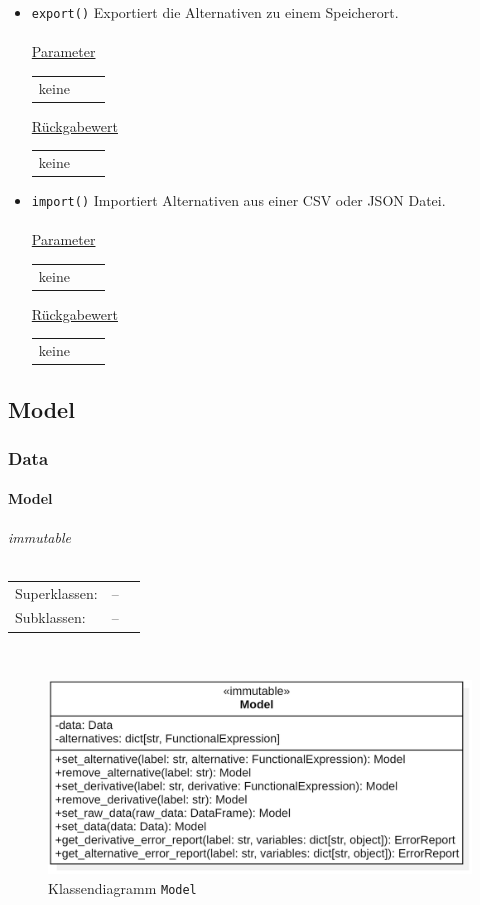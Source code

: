 \documentclass{article}
\newcommand{\classheader}[2][]{\paragraph{#2}
\mbox{}\textit{#1}\\\\}
\begin{document}
\begin{itemize}
\item \texttt{export()} \newline Exportiert die Alternativen zu einem Speicherort. 
\\\\
\underline{{Parameter}} 
\begin{tabular}{lll}
keine\\
\end{tabular}

\underline{{Rückgabewert}}
\begin{tabular}{lll}
keine\\
\end{tabular}

\item \texttt{import()} \newline Importiert Alternativen aus einer CSV oder JSON Datei.
\\\\
\underline{{Parameter}} 
\begin{tabular}{lll}
keine \\
\end{tabular}

\underline{{Rückgabewert}}
\begin{tabular}{lll}
keine \\
\end{tabular}

\end{itemize}

\newpage
\subsection{Model}
\subsubsection{Data}
\classheader[\flqq{}immutable\frqq]{Model}\label{cls:Model}
\begin{tabular}{lll}
 Superklassen: & --\\
 Subklassen: & --\\
\end{tabular}\\
\begin{figure}[H]%
    \centering
    \includegraphics[width=13cm]{entwurf/Entwurf_dokument/img/cls/model/Model.png}
    \caption{Klassendiagramm \texttt{Model}}
\end{figure}
\end{document}
